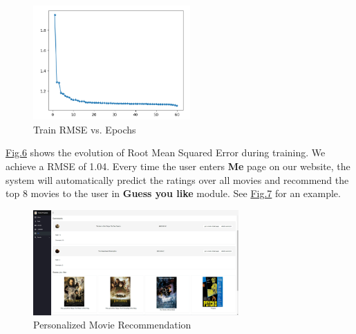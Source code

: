 \begin{CJK*}{UTF8}{gbsn}
\begin{figure}[htbp]
\begin{minipage}[t]{0.45\textwidth}
\end{minipage}
\begin{minipage}[t]{0.45\textwidth}
\centering
\includegraphics[width=6cm]{RBMResult.png}
\caption{Train RMSE vs. Epochs}
\end{minipage}
\end{figure}
\hyperref[RBM]{Fig.6} shows the evolution of Root Mean Squared Error during training. We achieve a RMSE of 1.04. Every time the user enters \textbf{Me} page on our website, the system will automatically predict the ratings over all movies and recommend the top 8 movies to the user in \textbf{Guess you like} module. See \hyperref[recommend]{Fig.7} for an example.
\begin{figure}[h]
    \centering
    \label{recommend}
    \includegraphics[width = 0.7\textwidth]{recommendation.png}
    \caption{Personalized Movie Recommendation}
\end{figure}

\end{CJK*}
